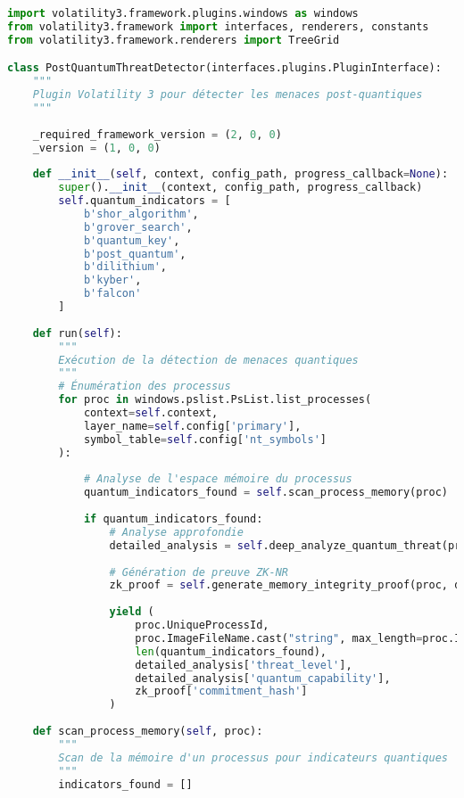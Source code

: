 \begin{lstlisting}[language=Python, caption=Plugin Volatility 3 pour détection d'attaques post-quantiques]
import volatility3.framework.plugins.windows as windows
from volatility3.framework import interfaces, renderers, constants
from volatility3.framework.renderers import TreeGrid

class PostQuantumThreatDetector(interfaces.plugins.PluginInterface):
    """
    Plugin Volatility 3 pour détecter les menaces post-quantiques
    """
    
    _required_framework_version = (2, 0, 0)
    _version = (1, 0, 0)
    
    def __init__(self, context, config_path, progress_callback=None):
        super().__init__(context, config_path, progress_callback)
        self.quantum_indicators = [
            b'shor_algorithm',
            b'grover_search', 
            b'quantum_key',
            b'post_quantum',
            b'dilithium',
            b'kyber',
            b'falcon'
        ]
        
    def run(self):
        """
        Exécution de la détection de menaces quantiques
        """
        # Énumération des processus
        for proc in windows.pslist.PsList.list_processes(
            context=self.context,
            layer_name=self.config['primary'],
            symbol_table=self.config['nt_symbols']
        ):
            
            # Analyse de l'espace mémoire du processus
            quantum_indicators_found = self.scan_process_memory(proc)
            
            if quantum_indicators_found:
                # Analyse approfondie
                detailed_analysis = self.deep_analyze_quantum_threat(proc)
                
                # Génération de preuve ZK-NR
                zk_proof = self.generate_memory_integrity_proof(proc, detailed_analysis)
                
                yield (
                    proc.UniqueProcessId,
                    proc.ImageFileName.cast("string", max_length=proc.ImageFileName.vol.count, errors='replace'),
                    len(quantum_indicators_found),
                    detailed_analysis['threat_level'],
                    detailed_analysis['quantum_capability'],
                    zk_proof['commitment_hash']
                )
    
    def scan_process_memory(self, proc):
        """
        Scan de la mémoire d'un processus pour indicateurs quantiques
        """
        indicators_found = []
        

\end{lstlisting}
